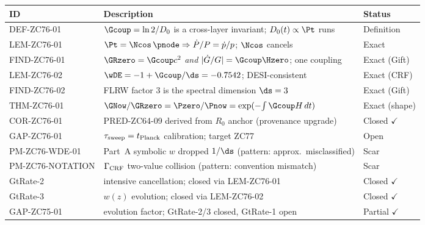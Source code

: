 \documentclass[12pt, a4paper]{article}
\begin{document}
\begin{formalbox}[title={Atomic Registry --- ZC76}]
\begin{center}
\renewcommand{\arraystretch}{1.3}
\small
\begin{tabular}{lp{8.0cm}l}
\toprule
\textbf{ID} & \textbf{Description} & \textbf{Status} \\
\midrule
DEF-ZC76-01
  & $\Gcoup=\ln2/D_0$ is a cross-layer invariant; $D_0(t)\propto\Pt$ runs
  & Definition \\[3pt]
LEM-ZC76-01
  & $\Pt=\Ncos\,\pnode \Rightarrow \dot{P}/P=\dot{p}/p$; $\Ncos$ cancels
  & Exact \\[3pt]
FIND-ZC76-01
  & $\GRzero=\Gcoup c^2$ \emph{and} $|\dot G/G|=\Gcoup\Hzero$; one coupling
  & Exact (Gift) \\[3pt]
LEM-ZC76-02
  & $\wDE=-1+\Gcoup/\ds=-0.7542$; DESI-consistent
  & Exact (CRF) \\[3pt]
FIND-ZC76-02
  & FLRW factor $3$ is the spectral dimension $\ds=3$
  & Exact (Gift) \\[3pt]
THM-ZC76-01
  & $\GNow/\GRzero=\Pzero/\Pnow=\exp(-\!\int\Gcoup H\,dt)$
  & Exact (shape) \\[3pt]
COR-ZC76-01
  & PRED-ZC64-09 derived from $R_0$ anchor (provenance upgrade)
  & Closed $\checkmark$ \\[3pt]
GAP-ZC76-01
  & $\tau_{\rm sweep}=t_{\rm Planck}$ calibration; target ZC77
  & Open \\[3pt]
PM-ZC76-WDE-01
  & Part~A symbolic $w$ dropped $1/\ds$ (pattern: approx.\ misclassified)
  & Scar \\[3pt]
PM-ZC76-NOTATION
  & $\Gamma_{\rm CRF}$ two-value collision (pattern: convention mismatch)
  & Scar \\[3pt]
\midrule
GtRate-2 & intensive cancellation; closed via LEM-ZC76-01
  & Closed $\checkmark$ \\
GtRate-3 & $w(z)$ evolution; closed via LEM-ZC76-02
  & Closed $\checkmark$ \\
GAP-ZC75-01 & evolution factor; GtRate-2/3 closed, GtRate-1 open
  & Partial $\checkmark$ \\
\bottomrule
\end{tabular}
\end{center}
\end{formalbox}
\end{document}
